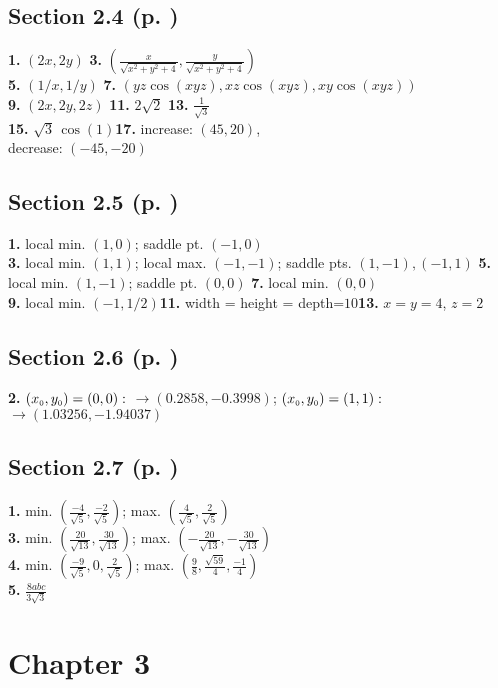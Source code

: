 \begin{multicols}{2}
\subsection*{Section 2.4 (p. \pageref{sec2dot4})}
\textbf{1.} $(2x,2y)$\quad
\textbf{3.} $(\frac{x}{\sqrt{x^2 + y^2 + 4}},\frac{y}{\sqrt{x^2 + y^2 + 4}})$\\
\textbf{5.} $(1/x,1/y)$\quad
\textbf{7.} $(yz\cos(xyz),xz\cos(xyz),xy\cos(xyz))$\\
\textbf{9.} $(2x,2y,2z)$\quad
\textbf{11.} $2\sqrt{2}$\quad
\textbf{13.} $\frac{1}{\sqrt{3}}$\\
\textbf{15.} $\sqrt{3}\,\cos(1)$\quad\textbf{17.} increase: $(45,20)$,\\decrease: $(-45,-20)$
\subsection*{Section 2.5 (p. \pageref{sec2dot5})}
\textbf{1.} local min. $(1,0)$; saddle pt. $(-1,0)$\\\textbf{3.}
local min. $(1,1)$; local max. $(-1,-1)$; saddle pts. $(1,-1),(-1,1)$\quad
\textbf{5.} local min. $(1,-1)$; saddle pt. $(0,0)$\quad
\textbf{7.} local min. $(0,0)$\\\textbf{9.} local min. $(-1,1/2)$\quad\textbf{11.}
width = height = depth=$10$\quad\textbf{13.} $x=y=4$, $z=2$
\subsection*{Section 2.6 (p. \pageref{sec2dot6})}
\textbf{2.} $(x_{\scriptscriptstyle 0},y_{\scriptscriptstyle 0})=(0,0):$ $\rightarrow (0.2858,-0.3998)$;
$(x_{\scriptscriptstyle 0},y_{\scriptscriptstyle 0})=(1,1):$ $\rightarrow (1.03256,-1.94037)$
\subsection*{Section 2.7 (p. \pageref{sec2dot7})}
\textbf{1.} min. $\left(\frac{-4}{\sqrt{5}},\frac{-2}{\sqrt{5}}\right)$;
max. $\left(\frac{4}{\sqrt{5}},\frac{2}{\sqrt{5}}\right)$\\\textbf{3.}
min. $\left(\frac{20}{\sqrt{13}},\frac{30}{\sqrt{13}}\right)$;
max. $\left(-\frac{20}{\sqrt{13}},-\frac{30}{\sqrt{13}}\right)$\\\textbf{4.}
min. $\left(\frac{-9}{\sqrt{5}},0,\frac{2}{\sqrt{5}}\right)$;
max. $\left(\frac{9}{8},\frac{\sqrt{59}}{4},\frac{-1}{4}\right)$\\\textbf{5.} $\frac{8abc}{3\sqrt{3}}$
\section*{Chapter 3}

\end{multicols}
